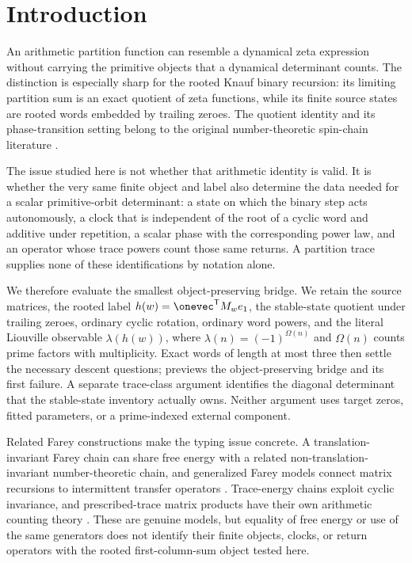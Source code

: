 \section{Introduction}
\label{sec:introduction}

An arithmetic partition function can resemble a dynamical zeta expression
without carrying the primitive objects that a dynamical determinant counts.
The distinction is especially sharp for the rooted Knauf binary recursion:
its limiting partition sum is an exact quotient of zeta functions, while its
finite source states are rooted words embedded by trailing zeroes.  The
quotient identity and its phase-transition setting belong to the original
number-theoretic spin-chain literature
\citep{knauf1993phases,knauf1998spin,knauf1999erratum}.

The issue studied here is not whether that arithmetic identity is valid.  It
is whether the very same finite object and label also determine the data
needed for a scalar primitive-orbit determinant: a state on which the binary
step acts autonomously, a clock that is independent of the root of a cyclic
word and additive under repetition, a scalar phase with the corresponding
power law, and an operator whose trace powers count those same returns.  A
partition trace supplies none of these identifications by notation alone.

We therefore evaluate the smallest object-preserving bridge.  We retain the
source matrices, the rooted label
$h(w)=\onevec^{\mathsf T}M_we_1$, the stable-state quotient under trailing
zeroes, ordinary cyclic rotation, ordinary word powers, and the literal
Liouville observable $\lambda(h(w))$, where
$\lambda(n)=(-1)^{\Omega(n)}$ and $\Omega(n)$ counts prime factors with
multiplicity.  Exact words of length at most three then settle the necessary
descent questions;  previews the object-preserving
bridge and its first failure.  A separate trace-class
argument identifies the diagonal determinant that the stable-state inventory
actually owns.  Neither argument uses target zeros, fitted parameters, or a
prime-indexed external component.

Related Farey constructions make the typing issue concrete.  A
translation-invariant Farey chain can share free energy with a related
non-translation-invariant number-theoretic chain, and generalized Farey
models connect matrix recursions to intermittent transfer operators
\citep{klebanOzluk1999farey,fiala2003phase,fialaKleban2005generalized}.
Trace-energy chains exploit cyclic invariance, and prescribed-trace matrix
products have their own arithmetic counting theory
\citep{prellbergFialaKleban2006cluster,technau2023farey}.  These are genuine
models, but equality of free energy or use of the same generators does not
identify their finite objects, clocks, or return operators with the rooted
first-column-sum object tested here.

